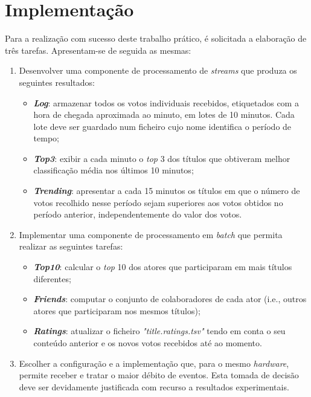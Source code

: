 \documentclass[a4paper]{report}
\begin{document}
\chapter{Implementação} \label{ch:Implementation}
\large {
    Para a realização com sucesso deste trabalho prático, é solicitada a elaboração de três tarefas. Apresentam-se de seguida as mesmas:
    \begin{enumerate}
        \item Desenvolver uma componente de processamento de \textit{streams} que produza os seguintes resultados:
        \begin{itemize}
            \item \textbf{\textit{Log}}: armazenar todos os votos individuais recebidos, etiquetados com a hora de chegada aproximada ao minuto, em lotes de 10 minutos. Cada lote deve ser guardado num ficheiro cujo nome identifica o período de tempo;
            \item \textbf{\textit{Top3}}: exibir a cada minuto o \textit{top} 3 dos títulos que obtiveram melhor classificação média nos últimos 10 minutos;
            \item \textbf{\textit{Trending}}: apresentar a cada 15 minutos os títulos em que o número de votos recolhido nesse período sejam superiores aos votos obtidos no período anterior, independentemente do valor dos votos.
        \end{itemize}
        \item Implementar uma componente de processamento em \textit{batch} que permita realizar as seguintes tarefas:
        \begin{itemize}
            \item \textbf{\textit{Top10}}: calcular o \textit{top} 10 dos atores que participaram em mais títulos diferentes;
            \item \textbf{\textit{Friends}}: computar o conjunto de colaboradores de cada ator (i.e., outros atores que participaram nos mesmos títulos);
            \item \textbf{\textit{Ratings}}: atualizar o ficheiro \textsl{"title.ratings.tsv"} tendo em conta o seu conteúdo anterior e os novos votos recebidos até ao momento.
        \end{itemize}
        \item Escolher a configuração e a implementação que, para o mesmo \textit{hardware}, permite receber e tratar o maior débito de eventos. Esta tomada de decisão deve ser devidamente justificada com recurso a resultados experimentais.
    \end{enumerate}
    
}
\end{document}
